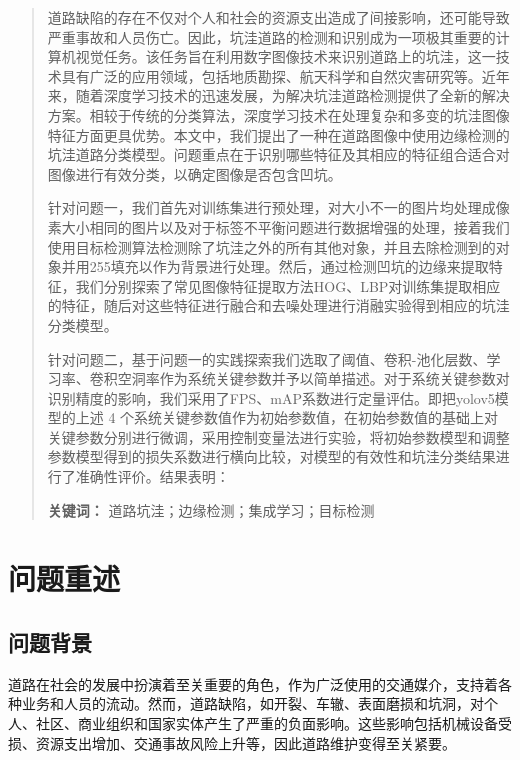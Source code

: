 \documentclass[a4paper, 10pt]{article}
\begin{document}
	\begin{abstract}
	
	道路缺陷的存在不仅对个人和社会的资源支出造成了间接影响，还可能导致严重事故和人员伤亡。因此，坑洼道路的检测和识别成为一项极其重要的计算机视觉任务。该任务旨在利用数字图像技术来识别道路上的坑洼，这一技术具有广泛的应用领域，包括地质勘探、航天科学和自然灾害研究等。近年来，随着深度学习技术的迅速发展，为解决坑洼道路检测提供了全新的解决方案。相较于传统的分类算法，深度学习技术在处理复杂和多变的坑洼图像特征方面更具优势。本文中，我们提出了一种在道路图像中使用边缘检测的坑洼道路分类模型。问题重点在于识别哪些特征及其相应的特征组合适合对图像进行有效分类，以确定图像是否包含凹坑。
	
	针对问题一，我们首先对训练集进行预处理，对大小不一的图片均处理成像素大小相同的图片以及对于标签不平衡问题进行数据增强的处理，接着我们使用目标检测算法检测除了坑洼之外的所有其他对象，并且去除检测到的对象并用255填充以作为背景进行处理。然后，通过检测凹坑的边缘来提取特征，我们分别探索了常见图像特征提取方法HOG、LBP对训练集提取相应的特征，随后对这些特征进行融合和去噪处理进行消融实验得到相应的坑洼分类模型。
	
	针对问题二，基于问题一的实践探索我们选取了阈值、卷积-池化层数、学习率、卷积空洞率作为系统关键参数并予以简单描述。对于系统关键参数对识别精度的影响，我们采用了FPS、mAP系数进行定量评估。即把yolov5模型的上述 4 个系统关键参数值作为初始参数值，在初始参数值的基础上对关键参数分别进行微调，采用控制变量法进行实验，将初始参数模型和调整参数模型得到的损失系数进行横向比较，对模型的有效性和坑洼分类结果进行了准确性评价。结果表明：
		
		
		\noindent
		\textbf{关键词：} 道路坑洼；边缘检测；集成学习；目标检测
	\end{abstract}
	
	
	\clearpage
	\tableofcontents
	
	\section{问题重述}
	
	\subsection{问题背景}
	
	道路在社会的发展中扮演着至关重要的角色，作为广泛使用的交通媒介，支持着各种业务和人员的流动。然而，道路缺陷，如开裂、车辙、表面磨损和坑洞，对个人、社区、商业组织和国家实体产生了严重的负面影响。这些影响包括机械设备受损、资源支出增加、交通事故风险上升等，因此道路维护变得至关紧要。
	
\end{document}
